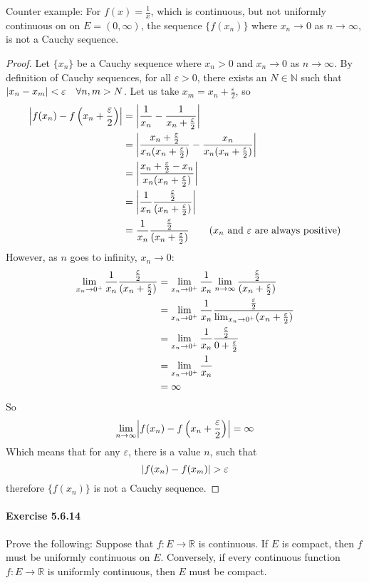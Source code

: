 \documentclass[11pt]{article}
\DeclarePairedDelimiter{\abs}{\lvert}{\rvert}
\def \R {\mathbb{R}}
\def \N {\mathbb{N}}
\def \epsilon {\varepsilon}
\def \halfepsilon {\frac{\epsilon}{2}}
\newcommand{\set}[1]{\{#1\}}
\def \limittoinfyn {\lim_{n \to \infty}}
\def \xn {x_n}
\def \xm {x_m}
\begin{document}
Counter example: For $f(x) = \frac{1}{x} $, which is continuous, but not uniformly continuous on on $E = (0, \infty)$, the sequence $\set{f(\xn)}$ where $\xn\to 0$ as $n \to \infty$, is not a Cauchy sequence. 
\begin{proof}
	Let $ \set{\xn}$ be a Cauchy sequence where $\xn > 0$ and $\xn \to 0$ as $n \to \infty$. By definition of Cauchy sequences, for all $\epsilon > 0$, there exists an $N \in \N$ such that $\abs{\xn - x_m} < \epsilon \quad \forall n, m > N$. Let us take $x_m = \xn + \halfepsilon$, so 
	\begin{align*}
		\abs*{f(\xn) - f\left(\xn + \halfepsilon\right)} &= \abs*{\frac{1}{\xn} - \frac{1}{\xn+ \halfepsilon}} \\
					&= \abs*{\frac{\xn + \halfepsilon}{\xn(\xn+ \halfepsilon)} - \frac{\xn}{\xn(\xn+ \halfepsilon)}} \\
					&= \abs*{\frac{\xn + \halfepsilon - \xn}{\xn(\xn+ \halfepsilon)}} \\
					&= \abs*{\frac{1}{\xn}\frac{\halfepsilon }{(\xn + \halfepsilon)}} \\
					&= \frac{1}{\xn}\frac{\halfepsilon }{(\xn+ \halfepsilon)} \tag{$\xn$ and $\epsilon$ are always positive}
	\end{align*}
	However, as $n$ goes to infinity, $\xn \to 0$:
	\begin{align*}
		\xntozero \frac{1}{\xn}\frac{\halfepsilon }{(\xn+ \halfepsilon)} &= \xntozero \frac{1}{\xn} \limittoinfyn \frac{\halfepsilon }{(\xn+ \halfepsilon)} \\
			&= \xntozero \frac{1}{\xn} \frac{\halfepsilon }{\xntozero(\xn+ \halfepsilon)}  \\
			&= \xntozero \frac{1}{\xn} \frac{\halfepsilon }{0 + \halfepsilon}    \\
			&= \xntozero \frac{1}{\xn} \\
			&= \infty
	\end{align*}
	So $$\limittoinfyn \abs*{f(\xn) - f\left(\xn + \halfepsilon\right)} = \infty$$
	Which means that for any $\epsilon$, there is a value $ n $, such that 
		$$\abs*{f(\xn) - f(\xm)} > \epsilon$$
	therefore $\set{f(\xn)}$ is not a Cauchy sequence.
\end{proof}

\paragraph{Exercise 5.6.14} Prove the following: Suppose that $f:E \to \R$ is continuous.
  If $E$ is compact, then $f$ must be uniformly continuous on $E$.
  Conversely, if every continuous function $f:E \to \R$ is uniformly continuous, then $E$ must be compact.
\end{document}
